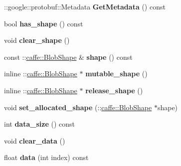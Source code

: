 \begin{DoxyCompactItemize}
\+::google\+::protobuf\+::\+Metadata {\bfseries Get\+Metadata} () const
\item 
\mbox{\label{classcaffe_1_1_blob_proto_a7fd496dfe2a2e5d1e4f8eb1400299bdd}} 
bool {\bfseries has\+\_\+shape} () const
\item 
\mbox{\label{classcaffe_1_1_blob_proto_a60ded92d2f07fe8847ee681c3a262240}} 
void {\bfseries clear\+\_\+shape} ()
\item 
\mbox{\label{classcaffe_1_1_blob_proto_aedd9f8158893dd9cf80d19bdc5dcccb8}} 
const \+::\mbox{\hyperlink{classcaffe_1_1_blob_shape}{caffe\+::\+Blob\+Shape}} \& {\bfseries shape} () const
\item 
\mbox{\label{classcaffe_1_1_blob_proto_a7f54f32098174198c9f880bde1af5416}} 
inline \+::\mbox{\hyperlink{classcaffe_1_1_blob_shape}{caffe\+::\+Blob\+Shape}} $\ast$ {\bfseries mutable\+\_\+shape} ()
\item 
\mbox{\label{classcaffe_1_1_blob_proto_a575f341974ae6d2593a1a4173ac56436}} 
inline \+::\mbox{\hyperlink{classcaffe_1_1_blob_shape}{caffe\+::\+Blob\+Shape}} $\ast$ {\bfseries release\+\_\+shape} ()
\item 
\mbox{\label{classcaffe_1_1_blob_proto_aef1b6e9464f1a2f76d703b7746fcdd61}} 
void {\bfseries set\+\_\+allocated\+\_\+shape} (\+::\mbox{\hyperlink{classcaffe_1_1_blob_shape}{caffe\+::\+Blob\+Shape}} $\ast$shape)
\item 
\mbox{\label{classcaffe_1_1_blob_proto_a5bf467af1332258dc23e3b8247e4c87a}} 
int {\bfseries data\+\_\+size} () const
\item 
\mbox{\label{classcaffe_1_1_blob_proto_a36aca8b30fa94970b8a67e17a9f56292}} 
void {\bfseries clear\+\_\+data} ()
\item 
\mbox{\label{classcaffe_1_1_blob_proto_a1621ebd555262b63222bf5069fcf00f0}} 
float {\bfseries data} (int index) const
\item 
\mbox{\label{classcaffe_1_1_blob_proto_aeebb47f4e3c8acbccd19954df7ad62d6}} 

\end{DoxyCompactItemize}
